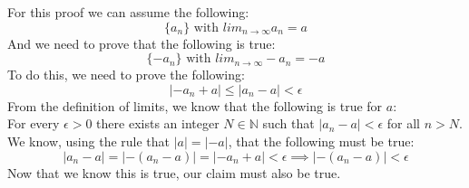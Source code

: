 For this proof we can assume the following:
$$
\{a_n\} \text{ with } lim_{n \rightarrow \infty}a_n = a
$$
And we need to prove that the following is true:
$$
\{-a_n\} \text{ with } lim_{n \rightarrow \infty}-a_n = -a
$$
To do this, we need to prove the following:
$$
|-a_n+a| \leq |a_n-a| < \epsilon
$$
From the definition of limits, we know that the following is true for $a$:\\
For every $\epsilon > 0$ there exists an integer $N \in \mathbb{N}$ such that $|a_n-a| < \epsilon$ for all $n > N$.\\
We know, using the rule that $|a|=|-a|$, that the following must be true:
$$
|a_n-a| = |-(a_n-a)| = |-a_n+a| < \epsilon \implies |-(a_n-a)| < \epsilon
$$
Now that we know this is true, our claim must also be true.